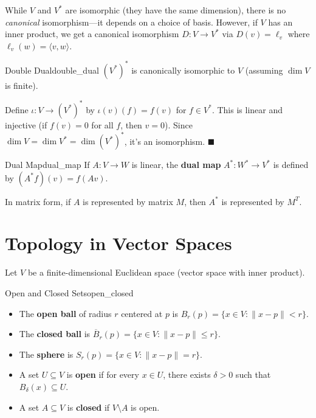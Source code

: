 \documentclass[11pt, letterpaper, openany]{book}
\renewenvironment{proof}[1][\proofname]{%
  \tcolorbox[blanker, breakable, left=1em,
    before skip=1em, after skip=1em,
    borderline west={2pt}{0pt}{MagicTeal!50},
    colback=MagicCream,
    before upper={\textcolor{MagicTeal}{\sffamily\bfseries #1.}\space}
  ]%
}{%
  \hfill\textcolor{MagicTeal}{\ensuremath{\blacksquare}}\endtcolorbox%
}
\begin{document}
\begin{remark}
While $V$ and $V^*$ are isomorphic (they have the same dimension), there is no \emph{canonical} isomorphism---it depends on a choice of basis. However, if $V$ has an inner product, we get a canonical isomorphism $D: V \to V^*$ via $D(v) = \ell_v$ where $\ell_v(w) = \langle v, w \rangle$.
\end{remark}

\begin{thm}{Double Dual}{double_dual}
$(V^*)^*$ is canonically isomorphic to $V$ (assuming $\dim V$ is finite).
\end{thm}

\begin{proof}
Define $\iota: V \to (V^*)^*$ by $\iota(v)(f) = f(v)$ for $f \in V^*$. This is linear and injective (if $f(v) = 0$ for all $f$, then $v = 0$). Since $\dim V = \dim V^* = \dim (V^*)^*$, it's an isomorphism.
\end{proof}

\begin{defn}{Dual Map}{dual_map}
If $A: V \to W$ is linear, the \textbf{dual map} $A^*: W^* \to V^*$ is defined by $(A^*f)(v) = f(Av)$.
\end{defn}

In matrix form, if $A$ is represented by matrix $M$, then $A^*$ is represented by $M^T$.

\section{Topology in Vector Spaces}

Let $V$ be a finite-dimensional Euclidean space (vector space with inner product).

\begin{defn}{Open and Closed Sets}{open_closed}
\begin{itemize}
    \item The \textbf{open ball} of radius $r$ centered at $p$ is $B_r(p) = \{x \in V : \|x - p\| < r\}$.
    \item The \textbf{closed ball} is $\overline{B}_r(p) = \{x \in V : \|x - p\| \leq r\}$.
    \item The \textbf{sphere} is $S_r(p) = \{x \in V : \|x - p\| = r\}$.
    \item A set $U \subseteq V$ is \textbf{open} if for every $x \in U$, there exists $\delta > 0$ such that $B_\delta(x) \subseteq U$.
    \item A set $A \subseteq V$ is \textbf{closed} if $V \setminus A$ is open.
\end{itemize}
\end{defn}
\end{document}
